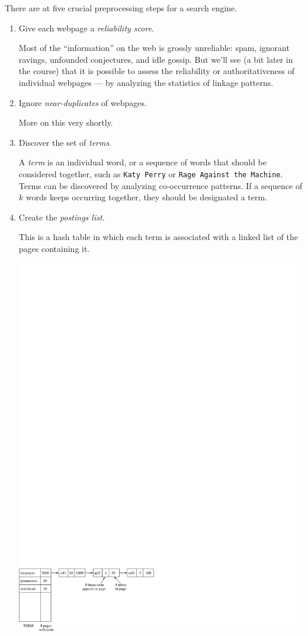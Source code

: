\documentclass{report}
\theoremstyle{plain}
\theoremstyle{definition}
\begin{document}
There are at five crucial preprocessing steps for a search engine.
\begin{enumerate}
\item Give each webpage a {\it reliability score}.

Most of the ``information'' on the web is grossly unreliable: spam, ignorant ravings, unfounded conjectures, and idle gossip. But we'll see (a bit later in the course) that it is possible to assess the reliability or authoritativeness of individual webpages --- by analyzing the statistics of linkage patterns.

\item Ignore {\it near-duplicates} of webpages.

More on this very shortly.

\item Discover the set of {\it terms}.

A {\it term} is an individual word, or a sequence of words that should be considered together, such as {\tt Katy Perry} or {\tt Rage Against the Machine}. Terms can be discovered by analyzing co-occurrence patterns. If a sequence of $k$ words keeps occurring together, they should be designated a term.

\item Create the {\it postings list}.

This is a hash table in which each term is associated with a linked list of the pages containing it.

\begin{center}
\includegraphics[width=5in]{figs/postings.pdf}
\end{center}


\end{enumerate}
\end{document}
